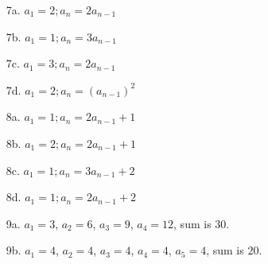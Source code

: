 {\begin{enumerate}
        \item[7a.]  $a_{1} = 2; a_{n} = 2a_{n-1}$
        \item[7b.]  $a_{1} = 1; a_{n} = 3a_{n-1}$
        \item[7c.]  $a_{1} = 3; a_{n} = 2a_{n-1}$
        \item[7d.]  $a_{1} = 2; a_{n} = (a_{n-1})^{2}$

        \item[8a.]  $a_{1} = 1; a_{n} = 2a_{n-1} + 1$
        \item[8b.]  $a_{1} = 2; a_{n} = 2a_{n-1} + 1$
        \item[8c.]  $a_{1} = 1; a_{n} = 3a_{n-1} + 2$
        \item[8d.]  $a_{1} = 1; a_{n} = 2a_{n-1} + 2$

        \item[9a.]  $a_{1} = 3$, $a_{2} = 6$, $a_{3} = 9$, $a_{4} = 12$, sum is $30$.
        \item[9b.]  $a_{1} = 4$, $a_{2} = 4$, $a_{3} = 4$, $a_{4} = 4$, $a_{5} = 4$, sum is $20$.
    \end{enumerate}
}

    



